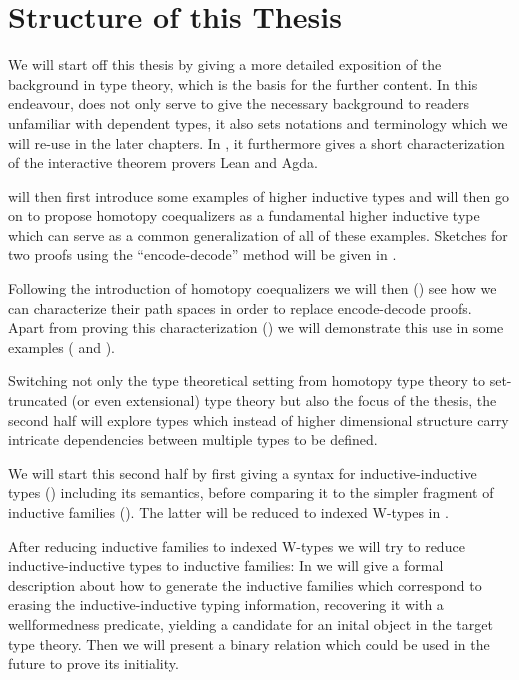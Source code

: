 \section{Structure of this Thesis}

We will start off this thesis by giving a more detailed exposition of the
background in type theory, which is the basis for the further content.
In this endeavour,  does not only serve to give the necessary background
to readers unfamiliar with dependent types, it also sets notations and terminology
which we will re-use in the later chapters.
In , it furthermore gives a short characterization of the interactive
theorem pro\-vers Lean and Agda.

 will then first introduce some examples of higher inductive types
and will then go on to propose homotopy coequalizers as a fundamental higher
inductive type which can serve as a common generalization of all of these examples.
Sketches for two proofs using the ``encode-decode'' method will be given in
.

Following the introduction of homotopy coequalizers we will then ()
see how we can
characterize their path spaces in order to replace encode-decode proofs.
Apart from proving this characterization ()
we will demonstrate this use in some examples (
and ).

Switching not only the type theoretical setting from homotopy type theory
to set-truncated (or even extensional) type theory
but also the focus of the thesis, the second half will explore types which
instead of higher dimensional structure carry intricate dependencies between
multiple types to be defined.

We will start this second half by first giving a syntax for inductive-inductive
types () including its semantics,
before comparing it to the simpler fragment of inductive families ().
The latter will be reduced to indexed W-types in .

After reducing inductive families to indexed W-types we will try to reduce
inductive-inductive types to inductive families:
In  we will give a formal description about how to generate the
inductive families which correspond to
erasing the inductive-inductive typing information,
recovering it with a wellformedness predicate, yielding a candidate for an inital
object in the target type theory.
Then we will present a binary relation which could be used in the future to prove
its initiality.










